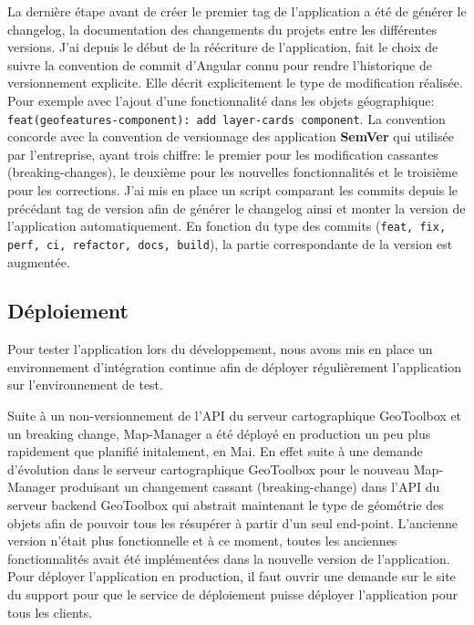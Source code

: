 \documentclass{rapportUHA40}
\begin{document}
La dernière étape avant de créer le premier tag de l'application a été de
générer le changelog, la documentation des changements du projets entre les
différentes versions. J'ai depuis le début de la réécriture de l'application,
fait le choix de suivre la convention de commit d'Angular connu pour rendre
l'historique de versionnement explicite. Elle décrit explicitement le type de
modification réalisée. Pour exemple avec l'ajout d'une fonctionnalité dans les
objets géographique: \\ \texttt{feat(geofeatures-component): add
  layer-cards component}. La convention concorde avec la convention de
versionnage des application \textbf{SemVer} qui utilisée par l'entreprise,
ayant trois chiffre: le premier pour les modification cassantes
(breaking-changes), le deuxième pour les nouvelles fonctionnalités et le
troisième pour les corrections. J'ai mis en place un script comparant les
commits depuis le précédant tag de version afin de générer le changelog ainsi
et monter la version de l'application automatiquement. En fonction du type des
commits (\texttt{feat, fix, perf, ci, refactor, docs, build}), la
partie correspondante de la version est augmentée.

\subsection{Déploiement}

Pour tester l'application lors du développement, nous avons mis en place un
environnement d'intégration continue afin de déployer régulièrement
l'application sur l'environnement de test.

Suite à un non-versionnement de l'API du serveur cartographique GeoToolbox et
un breaking change, Map-Manager a été déployé en production un peu plus
rapidement que planifié initalement, en Mai. En effet suite à une demande
d'évolution dans le serveur cartographique GeoToolbox pour le nouveau
Map-Manager produisant un changement cassant (breaking-change) dans l'API du
serveur backend GeoToolbox qui abstrait maintenant le type de géométrie des
objets afin de pouvoir tous les résupérer à partir d'un seul end-point.
L'ancienne version n'était plus fonctionnelle et à ce moment, toutes les
anciennes fonctionnalités avait été implémentées dans la nouvelle version de
l'application. Pour déployer l'application en production, il faut ouvrir une
demande sur le site du support pour que le service de déploiement puisse
déployer l'application pour tous les clients.
\end{document}
